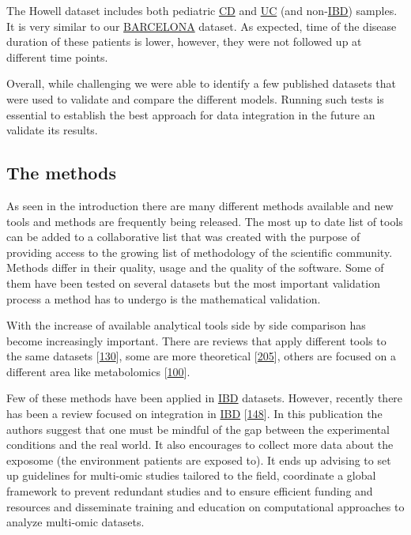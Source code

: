 \documentclass[
  12pt,
  a4paper,
  twoside,
  openright]{book}
\begin{document}
The Howell dataset includes both pediatric \protect\hyperlink{acronyms_CD}{CD} and \protect\hyperlink{acronyms_UC}{UC} (and non-\protect\hyperlink{acronyms_IBD}{IBD}) samples.
It is very similar to our \protect\hyperlink{acronyms_BARCELONA}{BARCELONA} dataset.
As expected, time of the disease duration of these patients is lower, however, they were not followed up at different time points.

Overall, while challenging we were able to identify a few published datasets that were used to validate and compare the different models.
Running such tests is essential to establish the best approach for data integration in the future an validate its results.

\hypertarget{the-methods}{%
\subsection{The methods}\label{the-methods}}

As seen in the introduction there are many different methods available and new tools and methods are frequently being released.
The most up to date list of tools can be added to a collaborative list that was created with the purpose of providing access to the growing list of methodology of the scientific community.
Methods differ in their quality, usage and the quality of the software.
Some of them have been tested on several datasets but the most important validation process a method has to undergo is the mathematical validation.

With the increase of available analytical tools side by side comparison has become increasingly important.
There are reviews that apply different tools to the same datasets {[}\protect\hyperlink{ref-cantini2021}{130}{]}, some are more theoretical {[}\protect\hyperlink{ref-bersanelli2016}{205}{]}, others are focused on a different area like metabolomics {[}\protect\hyperlink{ref-cavill2016}{100}{]}.

Few of these methods have been applied in \protect\hyperlink{acronyms_IBD}{IBD} datasets.
However, recently there has been a review focused on integration in \protect\hyperlink{acronyms_IBD}{IBD} {[}\protect\hyperlink{ref-sudhakar2022}{148}{]}.
In this publication the authors suggest that one must be mindful of the gap between the experimental conditions and the real world.
It also encourages to collect more data about the exposome (the environment patients are exposed to).
It ends up advising to set up guidelines for multi-omic studies tailored to the field, coordinate a global framework to prevent redundant studies and to ensure efficient funding and resources and disseminate training and education on computational approaches to analyze multi-omic datasets.
\end{document}
